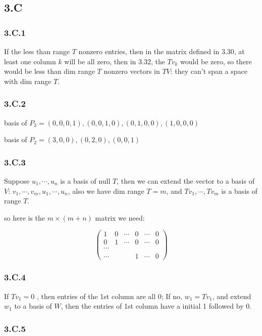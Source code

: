 \subsection*{3.C}
\subsubsection*{3.C.1}

If the less than range $T$ nonzero entries, then in the matrix defined in 3.30, at least one column $k$ will be all zero, then in 3.32, the $Tv_{k}$ would be zero, so there would be less than dim range $T$ nonzero vectors in $TV$: they can't span a space with dim range $T$.

\subsubsection*{3.C.2}

basis of $P_{3} = (0, 0, 0, 1), (0, 0, 1, 0), (0, 1, 0, 0), (1, 0, 0,0)$ 

basis of $P_{2} = (3, 0, 0), (0, 2,  0), (0, 0, 1)$

\subsubsection*{3.C.3}

Suppose $u_{1}, \cdots, u_{n}$ is a basis of null $T$, then we can extend the vector to a basis of $V$: $v_{1},\cdots, v_{m}, u_{1}, \cdots, u_{n} $, also we have dim range $T = m$, and $Tv_{1}, \cdots, Tv_{m}$ is a basis of range $T$.

so here is the $m \times (m+n)$ matrix  we need:

\[
\begin{pmatrix}
1 & 0 & \cdots & 0 & \cdots & 0\\
0 & 1 & \cdots & 0 & \cdots & 0\\
\cdots \\
\cdots &  & & 1 & \cdots & 0 
\end{pmatrix}
\]

\subsubsection*{3.C.4}

If $Tv_{1} = 0$ , then entries of the 1st column are all 0; If no, $w_{1} = Tv_{1}$, and extend $w_{1}$ to a basis of $W$, then the entries of 1st column have a initial 1 followed by 0.

\subsubsection*{3.C.5}

